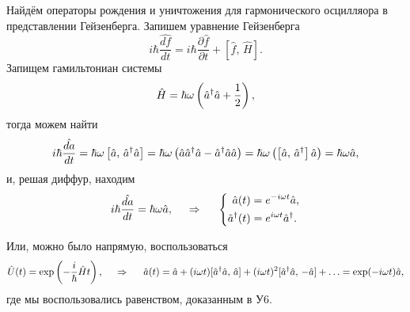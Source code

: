 Найдём операторы рождения и уничтожения для гармонического осцилляора в представлении Гейзенберга. Запишем уравнение Гейзенберга
\begin{equation*}
    i \hbar \frac{\hat{d f}}{d t}  = i \hbar \frac{\partial \hat{f}}{\partial t} + \left[\hat{f},\, \hat{H}\right].
\end{equation*}
Запищем гамильтониан системы
\begin{equation*}
    \hat{H} = \hbar \omega \left(\hat{a}^{\dag} \hat{a} + \frac{1}{2}\right),
\end{equation*}
тогда можем найти
\begin{equation*}
    i \hbar \frac{\hat{d a}}{d t} = \hbar \omega \left[\hat{a},\, \hat{a}^{\dag} \hat{a}\right] = \hbar \omega \left(
        \hat{a} \hat{a}^{\dag} \hat{a} - \hat{a}^{\dag} \hat{a} \hat{a}
    \right) = \hbar \omega \left(
        \left[\hat{a},\, \hat{a}^{\dag}\right] \hat{a}
    \right) = \hbar \omega \hat{a},
\end{equation*}
и, решая диффур, находим
\begin{equation*}
    i \hbar \frac{\hat{d a}}{d t} = \hbar \omega \hat{a},
    \hspace{0.5cm} \Rightarrow \hspace{0.5cm}
    \left\{\begin{aligned}
        \hat{a}(t) &= e^{- i \omega t} \hat{a}, \\
        \hat{a}^{\dag}(t) &= e^{i \omega t} \hat{a}^{\dag}.
    \end{aligned}\right.
\end{equation*}

Или, можно было напрямую, воспользоваться
\begin{equation*}
    \hat{U}(t) = \exp\left(
        - \frac{i}{\hbar} \hat{H} t
    \right),
    \hspace{0.5cm} \Rightarrow \hspace{0.5cm}
    \hat{a}(t) = \hat{a} + (i \omega t) [
        \hat{a}^{\dag} \hat{a},\, \hat{a}
    ] + (i \omega t)^2 [\hat{a}^{\dag} \hat{a},\, -\hat{a}] + \ldots = \exp(- i \omega t) \hat{a}, 
\end{equation*}
где мы воспользовались равенством, доказанным в У6.
